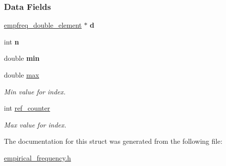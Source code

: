 \subsubsection*{Data Fields}
\begin{DoxyCompactItemize}
\item 
\mbox{\label{structempfreq__double__struct_a6f6adf630ca569cabaa40dbf8c0e53bf}} 
\hyperlink{structempfreq__double__element}{empfreq\+\_\+double\+\_\+element} $\ast$ {\bfseries d}
\item 
\mbox{\label{structempfreq__double__struct_af590c9b48655f0fc0d02a748fca747c3}} 
int {\bfseries n}
\item 
\mbox{\label{structempfreq__double__struct_a6737c6f8768a55f7c7fa56ee567a1888}} 
double {\bfseries min}
\item 
\mbox{\label{structempfreq__double__struct_afb2643a2e265010b6dfdf24086b8cbfe}} 
double \hyperlink{structempfreq__double__struct_afb2643a2e265010b6dfdf24086b8cbfe}{max}
\begin{DoxyCompactList}\small\item\em Min value for index. \end{DoxyCompactList}\item 
\mbox{\label{structempfreq__double__struct_a3992dabc855183309cbc0c78c0bf8a35}} 
int \hyperlink{structempfreq__double__struct_a3992dabc855183309cbc0c78c0bf8a35}{ref\+\_\+counter}
\begin{DoxyCompactList}\small\item\em Max value for index. \end{DoxyCompactList}\end{DoxyCompactItemize}


The documentation for this struct was generated from the following file\+:\begin{DoxyCompactItemize}
\item 
\hyperlink{empirical__frequency_8h}{empirical\+\_\+frequency.\+h}\end{DoxyCompactItemize}
